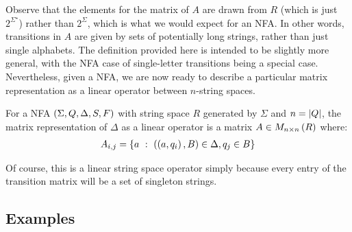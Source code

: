 Observe that the elements for the matrix of \(A\) are drawn from
\(R\) (which is just \(2^{\Sigma^\star}\))
rather than \(2^{\Sigma}\),
which is what we would expect for an NFA.
In other words, transitions in \(A\) are given by sets of potentially
long strings, rather than just single alphabets.
The definition provided here is intended to be slightly more general,
with the NFA case of single-letter transitions being a special case.
Nevertheless,
given a NFA, we are now ready to describe a particular matrix representation
as a linear operator between \(n\)-string spaces.

\begin{definition}
  For a NFA \(\left(\Sigma, Q, \Delta, S, F\right)\) with
  string space \(R\) generated by \(\Sigma\) and \(n = \left\lvert Q\right\rvert\),
  the matrix representation of \(\Delta\) as a linear operator
  is a matrix
  \(A \in M_{n \times n} \left(R\right)\)  where:
  \begin{align*}
    A_{i, j}
      = \left\{a \  : \  \left(\left(a, q_i\right), B\right) \in \Delta, q_j \in B\right\}
  \end{align*}
\end{definition}

Of course, this is a linear string space operator simply because
every entry of the transition matrix will be a set of singleton strings.



\subsection{Examples}

